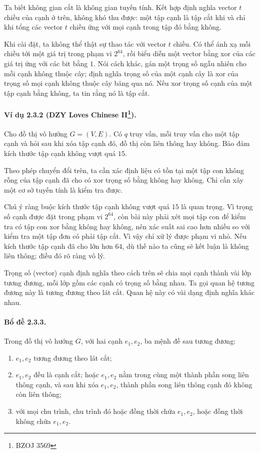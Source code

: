 \documentclass[11pt]{article}
\begin{document}
Ta biết không gian cắt là không gian tuyến tính. Kết hợp định nghĩa vector
$t$ chiều của cạnh ở trên, không khó thu được: một tập cạnh là tập cắt khi và
chỉ khi tổng các vector $t$ chiều ứng với mọi cạnh trong tập đó bằng không.

Khi cài đặt, ta không thể thật sự thao tác với vector $t$ chiều. Có thể ánh xạ
mỗi chiều tới một giá trị trong phạm vi $2^{64}$, rồi biểu diễn một vector bằng
xor của các giá trị ứng với các bit bằng $1$. Nói cách khác, gán một trọng số
ngẫu nhiên cho mỗi cạnh không thuộc cây; định nghĩa trọng số của một cạnh cây là
xor của trọng số mọi cạnh không thuộc cây băng qua nó. Nếu xor trọng số cạnh của
một tập cạnh bằng không, ta tin rằng nó là tập cắt.

\paragraph{Ví dụ 2.3.2 (DZY Loves Chinese II\protect\footnote{BZOJ 3569}).}
Cho đồ thị vô hướng $G=(V,E)$. Có $q$ truy vấn, mỗi truy vấn cho một tập cạnh và
hỏi sau khi xóa tập cạnh đó, đồ thị còn liên thông hay không. Bảo đảm kích thước
tập cạnh không vượt quá $15$.

Theo phép chuyển đổi trên, ta cần xác định liệu có tồn tại một tập con không
rỗng của tập cạnh đã cho có xor trọng số bằng không hay không. Chỉ cần xây một
cơ sở tuyến tính là kiểm tra được.

Chú ý ràng buộc kích thước tập cạnh không vượt quá $15$ là quan trọng. Vì trọng
số cạnh được đặt trong phạm vi $2^{64}$, còn bài này phải xét mọi tập con để
kiểm tra có tập con xor bằng không hay không, nên xác suất sai cao hơn nhiều so
với kiểm tra một tập đơn có phải tập cắt. Vì vậy chỉ xử lý được phạm vi nhỏ. Nếu
kích thước tập cạnh đã cho lớn hơn $64$, dù thế nào ta cũng sẽ kết luận là không
liên thông; điều đó rõ ràng vô lý.

Trọng số (vector) cạnh định nghĩa theo cách trên sẽ chia mọi cạnh thành vài lớp
tương đương, mỗi lớp gồm các cạnh có trọng số bằng nhau. Ta gọi quan hệ tương
đương này là tương đương theo lát cắt. Quan hệ này có vài dạng định nghĩa khác
nhau.

\paragraph{Bổ đề 2.3.3.}
Trong đồ thị vô hướng $G$, với hai cạnh $e_1,e_2$, ba mệnh đề sau tương đương:
\begin{enumerate}
  \item $e_1,e_2$ tương đương theo lát cắt;
  \item $e_1,e_2$ đều là cạnh cắt; hoặc $e_1,e_2$ nằm trong cùng một thành phần
  song liên thông cạnh, và sau khi xóa $e_1,e_2$, thành phần song liên thông
  cạnh đó không còn liên thông;
  \item với mọi chu trình, chu trình đó hoặc đồng thời chứa $e_1,e_2$, hoặc
  đồng thời không chứa $e_1,e_2$.
\end{enumerate}
\end{document}

